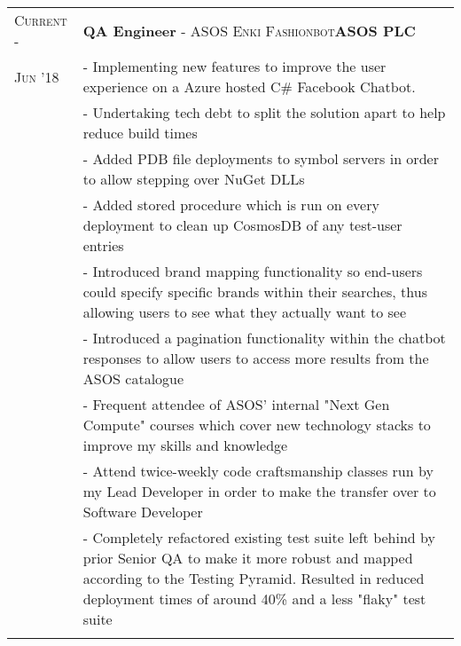 \documentclass[a4paper,10pt]{extarticle} %
\begin{document}
{\begin{tabularx}{\linewidth}{ l | X }


\textsc{Current -} & \textbf{QA Engineer} \textsc{ - ASOS Enki Fashionbot}\hfill\textbf{ASOS PLC}\\
\textsc{Jun '18}& {- Implementing new features to improve the user experience on a Azure hosted C\# Facebook Chatbot. }\\
& {- Undertaking tech debt to split the solution apart to help reduce build times}\\
& {- Added PDB file deployments to symbol servers in order to allow stepping over NuGet DLLs}\\
& {- Added stored procedure which is run on every deployment to clean up CosmosDB of any test-user entries}\\
& {- Introduced brand mapping functionality so end-users could specify specific brands within their searches, thus allowing users to see what they actually want to see}\\
& {- Introduced a pagination functionality within the chatbot responses to allow users to access more results from the ASOS catalogue}\\
& {- Frequent attendee of ASOS' internal "Next Gen Compute" courses which cover new technology stacks to improve my skills and knowledge}\\
& {- Attend twice-weekly code craftsmanship classes run by my Lead Developer in order to make the transfer over to Software Developer}\\
& {- Completely refactored existing test suite left behind by prior Senior QA to make it more robust and mapped according to the Testing Pyramid. Resulted in reduced deployment times of around 40\% and a less "flaky" test suite}\\
\multicolumn{1}{c}{} \\




\end{tabularx}}
\end{document}
